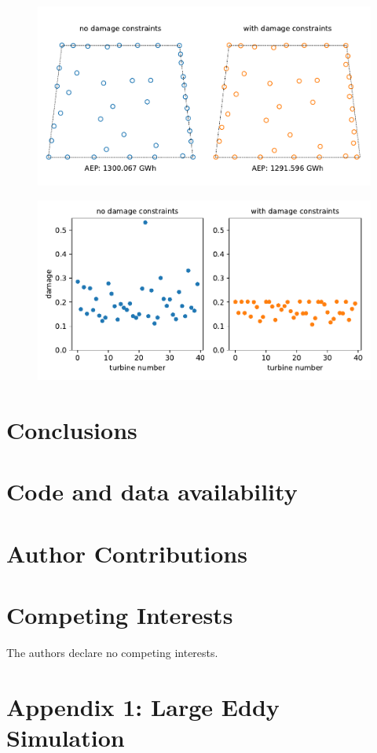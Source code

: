 \documentclass[11pt,letterpaper]{article}
\begin{document}
\begin{figure}
    \centering
    \includegraphics{images/opt_layouts.pdf}
    \caption{}
    \label{layouts}
\end{figure}

\begin{figure}
    \centering
    \includegraphics{images/opt_damage_vals.pdf}
    \caption{}
    \label{layouts}
\end{figure}

\section{Conclusions}

\section*{Code and data availability}


\section*{Author Contributions}


\section*{Competing Interests}
The authors declare no competing interests.






\section*{Appendix 1: Large Eddy Simulation}
\label{sec:les}
\end{document}
